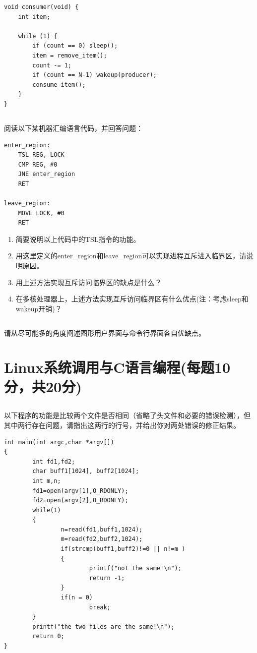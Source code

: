 \documentclass[a4paper,11pt]{article}
\begin{document}
\begin{CJK*}{UTF8}{gbsn}
\begin{verbatim}
void consumer(void) {
    int item;

    while (1) {
        if (count == 0) sleep();
        item = remove_item();
        count -= 1;
        if (count == N-1) wakeup(producer);
        consume_item();
    }
}
\end{verbatim}


\newpage
\subsection{}
阅读以下某机器汇编语言代码，并回答问题：

%
\begin{verbatim}
enter_region:
    TSL REG, LOCK
    CMP REG, #0
    JNE enter_region
    RET

leave_region:
    MOVE LOCK, #0
    RET
\end{verbatim}
\begin{enumerate}
\item 简要说明以上代码中的TSL指令的功能。
\item 用这里定义的enter\_region和leave\_region可以实现进程互斥进入临界区，请说明原因。
\item 用上述方法实现互斥访问临界区的缺点是什么？
\item 在多核处理器上，上述方法实现互斥访问临界区有什么优点(注：考虑sleep和wakeup开销)？
\end{enumerate}

\newpage
\subsection{}
请从尽可能多的角度阐述图形用户界面与命令行界面各自优缺点。

\newpage
\section{Linux系统调用与C语言编程(每题10分，共20分)}

\subsection{}
以下程序的功能是比较两个文件是否相同（省略了头文件和必要的错误检测），但其中两行存在问题，请指出这两行的行号，并给出你对两处错误的修正结果。
%
\begin{verbatim}
int main(int argc,char *argv[])
{
        int fd1,fd2;
        char buff1[1024], buff2[1024];
        int m,n;
        fd1=open(argv[1],O_RDONLY);
        fd2=open(argv[2],O_RDONLY);
        while(1)
        {       
                n=read(fd1,buff1,1024);   
                m=read(fd2,buff2,1024);
                if(strcmp(buff1,buff2)!=0 || n!=m )
                {
                        printf("not the same!\n");
                        return -1;           
                }
                if(n = 0)
                        break;          
        }
        printf("the two files are the same!\n");
        return 0;
}
\end{verbatim}


\end{CJK*}
\end{document}
